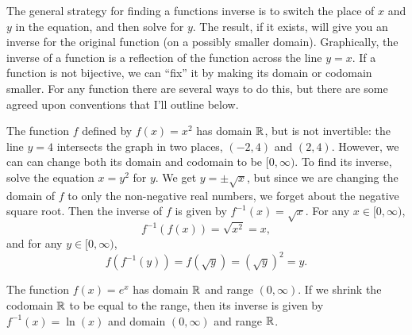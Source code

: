 The general strategy for finding a functions inverse is to switch the place of $x$ and $y$ in the equation, and then solve for $y$. The result, if it exists, will give you an inverse for the original function (on a possibly smaller domain). Graphically, the inverse of a function is a reflection of the function across the line $y=x$. If a function is not bijective, we can ``fix'' it by making its domain or codomain smaller. For any function there are several ways to do this, but there are some agreed upon conventions that I'll outline below.

\begin{exampleblock}
The function $f$ defined by $f(x)=x^2$ has domain $\mathbb{R}$, but is not invertible: the line $y=4$ intersects the graph in two places, $(-2,4)$ and $(2,4)$. However, we can can change both its domain and codomain to be $[0,\infty)$. To find its inverse, solve the equation $x=y^2$ for $y$. We get $y=\pm\sqrt{x}$, but since we are changing the domain of $f$ to only the non-negative real numbers, we forget about the negative square root. Then the inverse of $f$ is given by $f^{-1}(x)=\sqrt{x}$. For any $x\in[0,\infty)$,
$$f^{-1}(f(x))=\sqrt{x^2}=x,$$
and for any $y\in[0,\infty)$,
$$f(f^{-1}(y))=f(\sqrt{y})=(\sqrt{y})^2=y.$$
\end{exampleblock}
\begin{exampleblock}
The function $f(x)=e^x$ has domain $\mathbb{R}$ and range $(0,\infty)$. If we shrink the codomain $\mathbb{R}$ to be equal to the range, then its inverse is given by $f^{-1}(x)=\ln(x)$ and domain $(0,\infty)$ and range $\mathbb{R}$.
\end{exampleblock}
